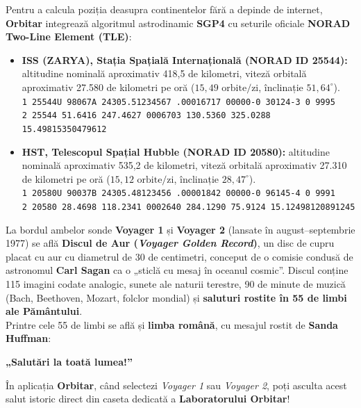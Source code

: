 \begin{tcolorbox}[orbitardata, title={\textbf{Propagare Orbitală SGP4 100\% Offline în Orbitar (\texttt{public/data/tle-iss.json})}}]
Pentru a calcula poziția deasupra continentelor fără a depinde de internet, \textbf{Orbitar} integrează algoritmul astrodinamic \textbf{SGP4} cu seturile oficiale \textbf{NORAD Two-Line Element (TLE)}:
\begin{itemize}[leftmargin=1.4em, itemsep=3pt]
  \item \textbf{ISS (ZARYA), Stația Spațială Internațională (NORAD ID 25544):} altitudine nominală aproximativ 418,5 de kilometri, viteză orbitală aproximativ 27.580 de kilometri pe oră ($15{,}49\text{ orbite/zi}$, înclinație $51{,}64^\circ$).\\
  {\scriptsize\texttt{1 25544U 98067A   24305.51234567  .00016717  00000-0  30124-3 0  9995}}\\
  {\scriptsize\texttt{2 25544  51.6416 247.4627 0006703 130.5360 325.0288 15.49815350479612}}
  \item \textbf{HST, Telescopul Spațial Hubble (NORAD ID 20580):} altitudine nominală aproximativ 535,2 de kilometri, viteză orbitală aproximativ 27.310 de kilometri pe oră ($15{,}12\text{ orbite/zi}$, înclinație $28{,}47^\circ$).\\
  {\scriptsize\texttt{1 20580U 90037B   24305.48123456  .00001842  00000-0  96145-4 0  9991}}\\
  {\scriptsize\texttt{2 20580  28.4698 118.2341 0002640 284.1290  75.9124 15.12498120891245}}
\end{itemize}
\end{tcolorbox}

\begin{tcolorbox}[orbitarjunior, title={\textbf{Discul de Aur Voyager (1977) și Salutul în Limba Română din Spațiul Interstelar}}]
La bordul ambelor sonde \textbf{Voyager 1} și \textbf{Voyager 2} (lansate în august--septembrie 1977) se află \textbf{Discul de Aur (\emph{Voyager Golden Record})}, un disc de cupru placat cu aur cu diametrul de $30$ de centimetri, conceput de o comisie condusă de astronomul \textbf{Carl Sagan} ca o „sticlă cu mesaj în oceanul cosmic”. Discul conține 115 imagini codate analogic, sunete ale naturii terestre, 90 de minute de muzică (Bach, Beethoven, Mozart, folclor mondial) și \textbf{saluturi rostite în 55 de limbi ale Pământului}.\\[4pt]
Printre cele 55 de limbi se află și \textbf{limba română}, cu mesajul rostit de \textbf{Sanda Huffman}:\\
\begin{center}
{\Large\bfseries\color{orbitarDeepBlue}„Salutări la toată lumea!”}
\end{center}
În aplicația \textbf{Orbitar}, când selectezi \emph{Voyager 1} sau \emph{Voyager 2}, poți asculta acest salut istoric direct din caseta dedicată a \textbf{Laboratorului Orbitar}!
\end{tcolorbox}

